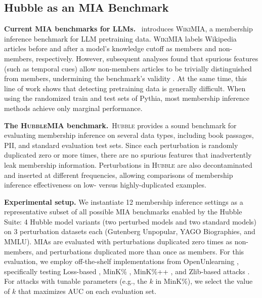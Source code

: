\documentclass{article} %
\begin{document}
\subsection{Hubble as an MIA Benchmark}
\label{sec:hubble_as_mia}

\textbf{Current MIA benchmarks for LLMs.}~ \citet{minkMIA} introduces \textsc{WikiMIA}, a membership inference benchmark for LLM pretraining data. \textsc{WikiMIA} labels Wikipedia articles before and after a model’s knowledge cutoff as members and non-members, respectively. However, subsequent analyses found that spurious features (such as temporal cues) allow non-members articles to be trivially distinguished from members, undermining the benchmark's validity \citep{duan2024membershipinferenceattackswork,meeus_sok_2025, naseh2025syntheticdatamisleadevaluations}. At the same time, this line of work shows that detecting pretraining data is generally difficult. When using the randomized train and test sets of Pythia, most membership inference methods achieve only marginal performance.

\textbf{The \textsc{HubbleMIA} benchmark.}~\textsc{Hubble} provides a sound benchmark for evaluating membership inference on several data types, including book passages, PII, and standard evaluation test sets. Since each perturbation is randomly duplicated zero or more times, there are no spurious features that inadvertently leak membership information. Perturbations in \textsc{Hubble} are also decontaminated and inserted at different frequencies, allowing comparisons of membership inference effectiveness on low- versus highly-duplicated examples. %

\textbf{Experimental setup.} We instantiate 12 membership inference settings as a representative subset of all possible MIA benchmarks enabled by the Hubble Suite: 4 Hubble model variants (two perturbed models and two standard models) on 3 perturbation datasets each (Gutenberg Unpopular, YAGO Biographies, and MMLU). MIAs are evaluated with perturbations duplicated zero times as non-members, and perturbations duplicated more than once as members. For this evaluation, we employ off-the-shelf implementations from OpenUnlearning \citep{dorna2025openunlearningacceleratingllmunlearning}, specifically testing Loss-based \citep{LossMIA}, MinK\% \citep{minkMIA}, MinK\%++ \citep{minkplusplusMIA}, and Zlib-based attacks \citep{carlini_extracting_2021}. For attacks with tunable parameters (e.g., the $k$ in MinK\%), we select the value of $k$ that maximizes AUC on each evaluation set.
\end{document}
